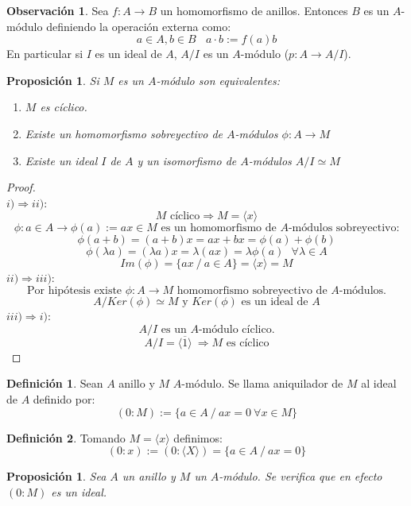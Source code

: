 \documentclass{article}
\theoremstyle{theorem-style}  %
\newtheorem{proposition}[theorem]{Proposición}
\theoremstyle{definition}
\newtheorem{definition}{Definición}[section]
\newtheorem*{observation}{Observación} %
\theoremstyle{example-style}
\begin{document}
	\begin{observation}
		Sea $f:A\rightarrow B$ un homomorfismo de anillos. Entonces $B$ es un $A$-módulo definiendo la operación
		externa como:\[
			a\in A,b\in B \ \ \ \ a\cdot b :=f(a)b
		\]
		En particular si $I$ es un ideal de $A$, $A/I$ es un $A$-módulo ($p:A\rightarrow A/I$).
	\end{observation}

	\begin{proposition}
		Si $M$ es un $A$-módulo son equivalentes:
		\begin{enumerate}[\hspace{1cm}i)]
			\item $M$ es cíclico.
			\item Existe un homomorfismo sobreyectivo de $A$-módulos $\phi :A\rightarrow M$
			\item Existe un ideal $I$ de $A$ y un isomorfismo de $A$-módulos $A/I \simeq M$
		\end{enumerate}
	\end{proposition}

	\begin{proof} \ \\
		$i)\Rightarrow ii)$:
		\[ M \text{ cíclico}\Rightarrow M=\langle x\rangle\]
		\[ \phi :a \in A\rightarrow \phi (a):=ax \in M \text{ es un homomorfismo de $A$-módulos sobreyectivo:}\]
		\[ \phi(a+b)=(a+b)x=ax+bx=\phi(a)+\phi(b)\]
		\[ \phi(\lambda a)=(\lambda a)x= \lambda(ax)=\lambda\phi(a) \ \ \ \forall\lambda\in A \]
		\[ Im(\phi)=\{ax \ / \ a\in A \} = \langle x\rangle=M\]
		$ii)\Rightarrow iii)$:
		\[ \text{Por hipótesis existe } \phi:A\rightarrow M \text{ homomorfismo sobreyectivo de $A$-módulos.}\]
		\[ A/Ker(\phi) \simeq M \text{ y $Ker(\phi)$ es un ideal de } A \]
		$iii)\Rightarrow i)$:
		\[ A/I \text{ es un $A$-módulo cíclico.} \]
		\[ A/I=\langle \overline{1}\rangle\ \Rightarrow\text{$M$ es cíclico} \]
	\end{proof}

	\begin{definition}
		Sean $A$ anillo y $M$ $A$-módulo. Se llama aniquilador de $M$ al ideal de $A$ definido por:
		\[(0:M):=\{a\in A \ / \ ax=0 \  \forall x \in M\}\]
	\end{definition}

	\begin{definition}
		Tomando $M=\langle x\rangle$ definimos:
		\[(0:x):=(0:\langle X\rangle)=\{a\in A \ / \ ax=0\}\]
	\end{definition}

	\begin{proposition}
		Sea $A$ un anillo y $M$ un $A$-módulo. Se verifica que en efecto $(0:M)$ es un ideal.
	\end{proposition}
\end{document}
